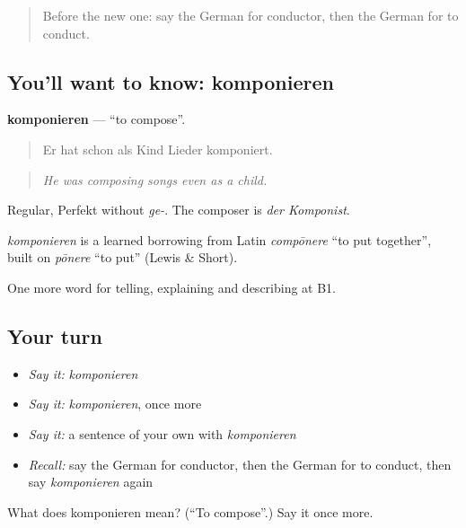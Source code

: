 \label{lesson:GE-C515-komponieren}



\begin{quote}
Before the new one: say the German for conductor, then the German for to conduct.
\end{quote}

\subsection*{You'll want to know: komponieren}
\textbf{komponieren} — \textquotedblleft{}to compose\textquotedblright{}.

\begin{quote}
Er hat schon als Kind Lieder komponiert.
\end{quote}

\begin{quote}
\emph{He was composing songs even as a child.}
\end{quote}

Regular, Perfekt without \emph{ge-}. The composer is \emph{der Komponist}.

\begin{cousinweb}
\emph{komponieren} is a learned borrowing from Latin \emph{compōnere} \textquotedblleft{}to put together\textquotedblright{}, built on \emph{pōnere} \textquotedblleft{}to put\textquotedblright{} (Lewis \& Short).
\end{cousinweb}

\begin{grammarlens}[title={What you've built}]
One more word for telling, explaining and describing at B1.
\end{grammarlens}

\subsection*{Your turn}
\begin{itemize}
\raggedright
  \item \emph{Say it:} \emph{komponieren}
  \item \emph{Say it:} \emph{komponieren}, once more
  \item \emph{Say it:} a sentence of your own with \emph{komponieren}
  \item \emph{Recall:} say the German for conductor, then the German for to conduct, then say \emph{komponieren} again
\end{itemize}

\begin{tcolorbox}[breakable,colback=teal!4,colframe=teal!35!black,title={Before you move on}]
What does komponieren mean? (\textquotedblleft{}To compose\textquotedblright{}.) Say it once more.
\end{tcolorbox}
